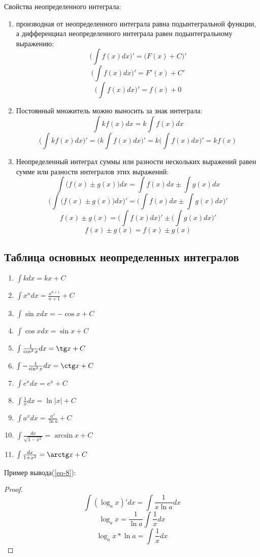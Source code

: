 \documentclass[12pt,a4paper]{article}
\begin{document}
Свойства неопределенного интеграла:
\begin{enumerate}
\item{производная от неопределенного интеграла равна подынтегральной функции, а дифференциал неопределенного интеграла равен подынтегральному выражению:
\[ \Big(\int f(x)dx \Big)' = \big( F(x) + C \big)' \]
\[ \Big( \int f(x)dx \Big)' = F'(x) + C' \]
\[ \Big( \int f(x)dx \Big)' = f(x) + 0 \]
}
\item{
Постоянный множитель можно выносить за знак интеграла:
\[ \int kf(x)dx = k \int f(x)dx \]
\[ \Big(\int kf(x)dx \Big)' = \Big(k \int f(x)dx \Big)' = k \Big( \int f(x)dx \Big)' = kf(x) \]
}
\item{
Неопределенный интеграл суммы или разности нескольких выражений равен сумме или разности интегралов этих выражений:
\[ \int \big(f(x) \pm g(x) \big)dx = \int f(x)dx \pm \int g(x)dx \]
}
\[ \Big(\int \big(f(x) \pm g(x) \big)dx \Big)' = \Big(\int f(x)dx \pm \int g(x)dx \Big)'  \]
\[ f(x) \pm g(x) = \Big(\int f(x)dx \Big)' \pm \Big(\int g(x)dx \Big)' \]
\[ f(x) \pm g(x) = f(x) \pm g(x) \]
\end{enumerate}
\subsection{Таблица основных неопределенных интегралов}

\begin{enumerate}[leftmargin=*, itemsep=0.4ex, before={\everymath{\displaystyle}}]%
\item{
$\int kdx = kx + C$
}
\item{
$\int x^ndx = \frac{x^{n + 1}}{n + 1} + C$
}
\item{
$\int \sin xdx = - \cos x + C$
}
\item{
$\int \cos xdx = \sin x + C$
}
\item{
$\int \frac{1}{\cos^2 x}dx = \tg x + C$
}
\item{
$\int - \frac{1}{\sin^2 x} dx = \ctg x + C$
}
\item{
$\int e^x dx = e^x + C$
}
\item{
\label{eq-8}
$\int \frac{1}{x}dx = \ln |x| + C$
}
\item{
$\int a^xdx = \frac{a^x}{\ln a} + C$
}
\item{
$\int \frac{dx}{\sqrt{1 - x^2}} = \arcsin x + C$
}
\item{
$\int \frac{dx}{1 + x^2} = \arctg x + C$
}
\end{enumerate}
 Пример вывода(\ref{eq-8}):
\begin{proof}
\[ \int (\log_{a} x)'dx = \int \frac{1}{x \ln a}dx\]
\[ \log_{a} x = \frac {1}{\ln a} \int \frac{1}{x} dx \]
\[ \log_{a} x * \ln a = \int \frac{1}{x} dx \]
\end{proof}
\end{document}
